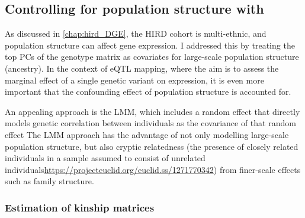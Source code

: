 \subsection{Controlling for population structure with }

As discussed in \autoref{chap:hird_DGE}, the \gls{HIRD} cohort is multi-ethnic, and population structure can affect gene expression\autocite{brown2018ExpressionReflectsPopulation}.
I addressed this by treating the top \glspl{PC} of the genotype matrix as covariates for large-scale population structure (ancestry).
In the context of \gls{eQTL} mapping, where the aim is to assess the marginal effect of a single genetic variant on expression, it is even more important that the confounding effect of population structure is accounted for.

%
An appealing approach is the \gls{LMM}, which includes a random effect that directly models genetic correlation between individuals as the covariance of that random effect\autocite{price2010NewApproachesPopulation, eu-ahsunthornwattana2014ComparisonMethodsAccount, golan2018MixedModelsCaseControl}
The \gls{LMM} approach has the advantage of not only modelling large-scale population structure, but also cryptic relatedness (the presence of closely related individuals in a sample assumed to consist of unrelated individuals\url{https://projecteuclid.org/euclid.ss/1271770342}) from finer-scale effects such as family structure\autocite{golan2018MixedModelsCaseControl}.

\subsubsection{Estimation of kinship matrices}


